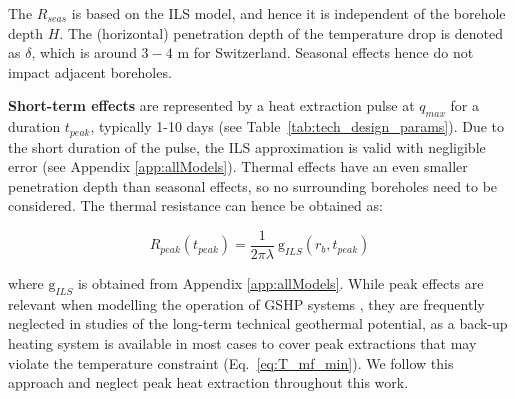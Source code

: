 The $R_{seas}$ is based on the ILS model, and hence it is independent of the borehole depth $H$.
The (horizontal) penetration depth of the temperature drop is denoted as $\delta$, which is around $3-4$ m for Switzerland. Seasonal effects hence do not impact adjacent boreholes. 

\textbf{Short-term effects} are represented by a heat extraction pulse at $q_\mathit{max}$ for a duration $t_\mathit{peak}$, typically 1-10 days (see Table~\ref{tab:tech_design_params}). Due to the short duration of the pulse, the ILS approximation is valid with negligible error (see Appendix \ref{app:allModels}). Thermal effects have an even smaller penetration depth than seasonal effects, so no surrounding boreholes need to be considered. The thermal resistance can hence be obtained as:

\begin{equation}
    R_\mathit{peak}(t_\mathit{peak}) = \frac{1}{2 \pi \lambda} \ \mathrm{g}_{ILS}(r_b, t_\mathit{peak})
\end{equation}

where $\mathrm{g}_{ILS}$ is obtained from Appendix \ref{app:allModels}.
While peak effects are relevant when modelling the operation of GSHP systems \cite{miglani_methodology_2018}, they are frequently neglected in studies of the long-term technical geothermal potential, as a back-up heating system is available in most cases to cover peak extractions that may violate the temperature constraint (Eq.~\ref{eq:T_mf_min}). We follow this approach and neglect peak heat extraction throughout this work. 


